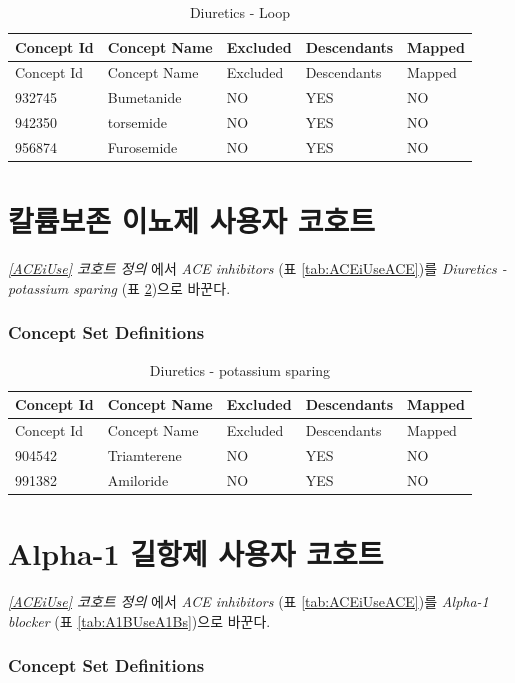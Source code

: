\documentclass[10.5pt]{book}
\theoremstyle{definition}
\theoremstyle{definition}
\theoremstyle{definition}
\theoremstyle{remark}
\begin{document}
\begin{longtable}[]{@{}lllll@{}}
\caption{\label{tab:DLoopUseDLoops} Diuretics - Loop}\tabularnewline
\toprule
Concept Id & Concept Name & Excluded & Descendants &
Mapped\tabularnewline
\midrule
\endfirsthead
\toprule
Concept Id & Concept Name & Excluded & Descendants &
Mapped\tabularnewline
\midrule
\endhead
932745 & Bumetanide & NO & YES & NO\tabularnewline
942350 & torsemide & NO & YES & NO\tabularnewline
956874 & Furosemide & NO & YES & NO\tabularnewline
\bottomrule
\end{longtable}

\section{칼륨보존 이뇨제 사용자 코호트}\label{DPUse}

\emph{\ref{ACEiUse} 코호트 정의} 에서 \emph{ACE inhibitors} (표
\ref{tab:ACEiUseACE})를 \emph{Diuretics - potassium sparing} (표
\ref{tab:DPUseDPs})으로 바꾼다.

\subsubsection*{Concept Set
Definitions}\label{concept-set-definitions-13}

\begin{longtable}[]{@{}lllll@{}}
\caption{\label{tab:DPUseDPs} Diuretics - potassium sparing}\tabularnewline
\toprule
Concept Id & Concept Name & Excluded & Descendants &
Mapped\tabularnewline
\midrule
\endfirsthead
\toprule
Concept Id & Concept Name & Excluded & Descendants &
Mapped\tabularnewline
\midrule
\endhead
904542 & Triamterene & NO & YES & NO\tabularnewline
991382 & Amiloride & NO & YES & NO\tabularnewline
\bottomrule
\end{longtable}

\section{Alpha-1 길항제 사용자 코호트}\label{A1BUse}

\emph{\ref{ACEiUse} 코호트 정의} 에서 \emph{ACE inhibitors} (표
\ref{tab:ACEiUseACE})를 \emph{Alpha-1 blocker} (표
\ref{tab:A1BUseA1Bs})으로 바꾼다.

\subsubsection*{Concept Set
Definitions}\label{concept-set-definitions-14}
\end{document}
